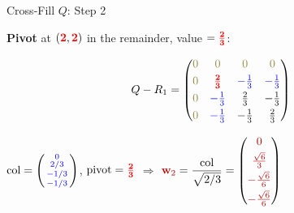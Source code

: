 \documentclass[10pt]{beamer}
\theoremstyle{definition}
\newcommand{\x}[1]{\alert{\textbf{#1}}}
\newcommand{\pvt}[1]{{\color{red}\mathbf{#1}}}       %
\newcommand{\crs}[1]{{\color{blue}#1}}                %
\newcommand{\ghost}[1]{{\color{yellow!50!black}#1}}   %
\newcommand{\rd}[1]{{\color{red!70!black}#1}}         %
\begin{document}
\begin{frame}{Cross-Fill $Q$: Step 2}

\x{Pivot} at $(\pvt{2},\pvt{2})$ in the remainder, value $= \pvt{\frac{2}{3}}$:

$$Q - R_1 = \begin{pmatrix} \ghost{0} & \ghost{0} & \ghost{0} & \ghost{0} \\[3pt] \ghost{0} & \pvt{\frac{2}{3}} & \crs{-\frac{1}{3}} & \crs{-\frac{1}{3}} \\[3pt] \ghost{0} & \crs{-\frac{1}{3}} & \frac{2}{3} & -\frac{1}{3} \\[3pt] \ghost{0} & \crs{-\frac{1}{3}} & -\frac{1}{3} & \frac{2}{3} \end{pmatrix}$$

$\text{col} = \left(\begin{smallmatrix} \crs{0} \\ \crs{2/3} \\ \crs{-1/3} \\ \crs{-1/3} \end{smallmatrix}\right)$, \quad $\text{pivot} = \pvt{\frac{2}{3}}$ \qquad $\Longrightarrow$ \qquad $\rd{\mathbf{w}_2} = \dfrac{\text{col}}{\sqrt{2/3}} = \begin{pmatrix} \rd{0} \\[3pt] \rd{\frac{\sqrt{6}}{3}} \\[3pt] \rd{-\frac{\sqrt{6}}{6}} \\[3pt] \rd{-\frac{\sqrt{6}}{6}} \end{pmatrix}$

\end{frame}
\end{document}
